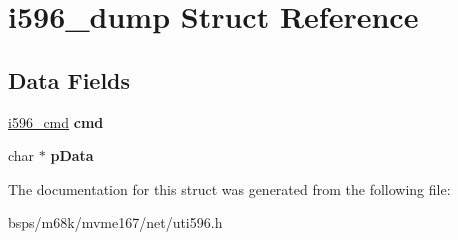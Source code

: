 \hypertarget{structi596__dump}{}\section{i596\+\_\+dump Struct Reference}
\label{structi596__dump}
\subsection*{Data Fields}
\begin{DoxyCompactItemize}
\item 
\mbox{\label{structi596__dump_ad2610b7cfcc3182caab9d619dddcd17f}} 
\mbox{\hyperlink{structi596__cmd}{i596\+\_\+cmd}} {\bfseries cmd}
\item 
\mbox{\label{structi596__dump_a8d99e6a07d9537a9f9bcff1cc7f942f3}} 
char $\ast$ {\bfseries p\+Data}
\end{DoxyCompactItemize}


The documentation for this struct was generated from the following file\+:\begin{DoxyCompactItemize}
\item 
bsps/m68k/mvme167/net/uti596.\+h\end{DoxyCompactItemize}
